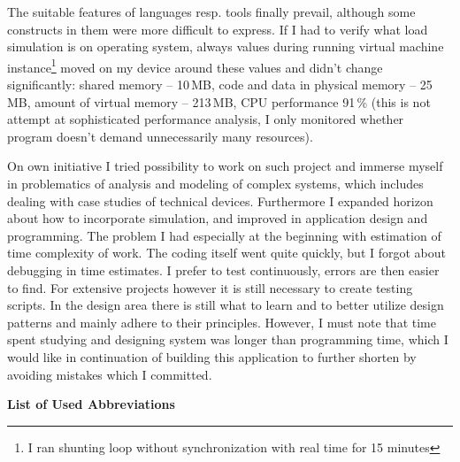 \documentclass[english]{cls/fitthesis}
\newcommand{\nadepsanaStranka}[1]{
  \newpage
  \vspace* {1.75cm}
  \begin{flushleft}
    \begin{Huge}
{\bf #1}
    \end{Huge}
  \end{flushleft}
  \vspace* {2cm}
}
\newcommand{\zkratky}{
  \nadepsanaStranka{List of Used Abbreviations}
  
}
\begin{document}
The suitable features of languages resp. tools finally prevail, although some constructs in them were more difficult
to express.
If I had to verify what load simulation is on operating system, always values during
running virtual machine instance\footnote{I ran shunting loop without synchronization with real time for 15 minutes} moved on my device around these values and didn't change significantly:
shared memory -- 10\,MB, code and data in physical memory -- 25\,MB, amount of virtual memory -- 213\,MB,
CPU performance 91\,\% (this is not attempt at sophisticated performance analysis, I only monitored whether program doesn't demand unnecessarily many resources).

On own initiative I tried possibility to work on such project and
immerse myself in problematics of analysis and modeling of complex systems,
which includes dealing with case studies of technical devices.
Furthermore I expanded horizon about how to incorporate simulation,
and improved in application design and programming.
The problem I had especially at the beginning with estimation of time complexity of work.
The coding itself went quite quickly, but I forgot about debugging in time estimates.
I prefer to test continuously, errors are then easier to find. For extensive projects however it is still necessary to create
testing scripts.
In the design area there is still what to learn and to better utilize design patterns and mainly adhere to their principles.
However, I must note that time spent studying and designing system was longer than programming time, which I would like in continuation of building this application to further shorten by avoiding mistakes which I committed.


\begin{flushleft}
 
\end{flushleft}

\zkratky
\end{document}
